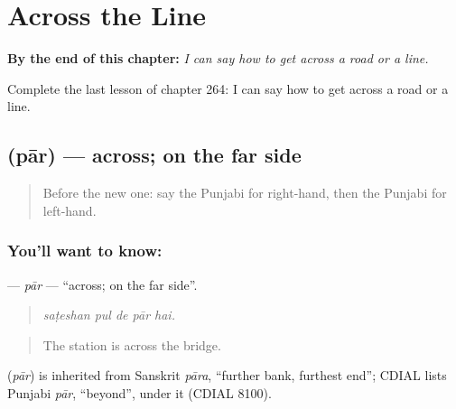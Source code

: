 
\chapter{Across the Line}
\label{ch:pa-a2-across-the-line}

\begin{chapteropening}
\textbf{By the end of this chapter:} \emph{I can say how to get across a road or a line.}

Complete the last lesson of chapter 264: I can say how to get across a road or a line.
\end{chapteropening}

\section[\texorpdfstring{\pa{ਪਾਰ} (pār)}{ਪਾਰ (pār)}]{ (pār) — across; on the far side}

\label{lesson:PA-C264-par}



\begin{quote}
Before the new one: say the Punjabi for right-hand, then the Punjabi for left-hand.
\end{quote}

\subsection*{You'll want to know: }
\textbf{} — \emph{pār} — \textquotedblleft{}across; on the far side\textquotedblright{}.

\begin{quote}
    
\end{quote}

\begin{quote}
\emph{saṭeshan pul de pār hai.}
\end{quote}

\begin{quote}
The station is across the bridge.
\end{quote}

\begin{cousinweb}
\textbf{} (\emph{pār}) is inherited from Sanskrit \emph{pāra}, \textquotedblleft{}further bank, furthest end\textquotedblright{}; CDIAL lists Punjabi \emph{pār}, \textquotedblleft{}beyond\textquotedblright{}, under it (CDIAL 8100).
\end{cousinweb}

